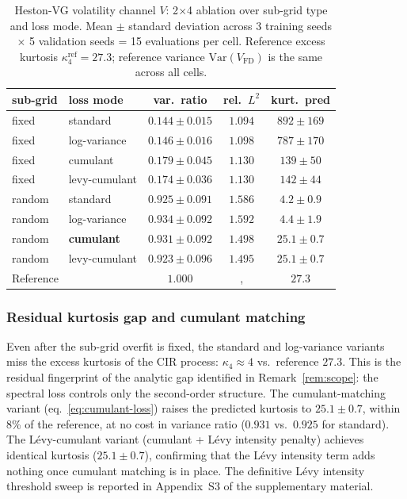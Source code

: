 \documentclass[review,12pt]{elsarticle}
\begin{document}
\begin{table}[h]
\centering
\caption{Heston-VG volatility channel \(V\): 2\(\times\)4 ablation
over sub-grid type and loss mode. Mean \(\pm\) standard deviation
across 3 training seeds \(\times\) 5 validation seeds = 15 evaluations
per cell. Reference excess kurtosis \(\kappa_4^{\mathrm{ref}} = 27.3\);
reference variance \(\mathrm{Var}(V_{\mathrm{FD}})\) is the same
across all cells.}
\label{tab:heston-2x4}
\begin{tabular}{l l c c c}
\toprule
sub-grid & loss mode & var.\ ratio & rel.\ $L^2$ & kurt.\ pred \\
\midrule
fixed & standard   & \(0.144 \pm 0.015\) & \(1.094\) & \(892 \pm 169\) \\
fixed & log-variance & \(0.146 \pm 0.016\) & \(1.098\) & \(787 \pm 170\) \\
fixed & cumulant   & \(0.179 \pm 0.045\) & \(1.130\) & \(139 \pm 50\) \\
fixed & levy-cumulant & \(0.174 \pm 0.036\) & \(1.130\) & \(142 \pm 44\) \\
\midrule
random & standard   & \(0.925 \pm 0.091\) & \(1.586\) & \(4.2 \pm 0.9\) \\
random & log-variance & \(0.934 \pm 0.092\) & \(1.592\) & \(4.4 \pm 1.9\) \\
random & \textbf{cumulant} & \(\mathbf{0.931 \pm 0.092}\) & \(1.498\) & \(\mathbf{25.1 \pm 0.7}\) \\
random & levy-cumulant & \(0.923 \pm 0.096\) & \(1.495\) & \(25.1 \pm 0.7\) \\
\midrule
\multicolumn{2}{l}{Reference} & $1.000$ &, & $27.3$ \\
\bottomrule
\end{tabular}
\end{table}

\subsubsection{Residual kurtosis gap and cumulant matching}

Even after the sub-grid overfit is fixed, the standard and
log-variance variants miss the excess kurtosis of the CIR
process: \(\kappa_4 \approx 4\) vs.\ reference \(27.3\). This
is the residual fingerprint of the analytic gap identified in
Remark~\ref{rem:scope}: the spectral loss controls only the
second-order structure. The cumulant-matching variant
(eq.~\eqref{eq:cumulant-loss}) raises the predicted kurtosis
to \(25.1 \pm 0.7\), within 8\% of the reference, at no cost in
variance ratio (\(0.931\) vs.\ \(0.925\) for standard). The
L\'evy-cumulant variant (cumulant + L\'evy intensity penalty)
achieves identical kurtosis (\(25.1 \pm 0.7\)), confirming that
the L\'evy intensity term adds nothing once cumulant matching
is in place. The definitive L\'evy intensity threshold sweep is
reported in Appendix~S3 of the supplementary material.
\end{document}

